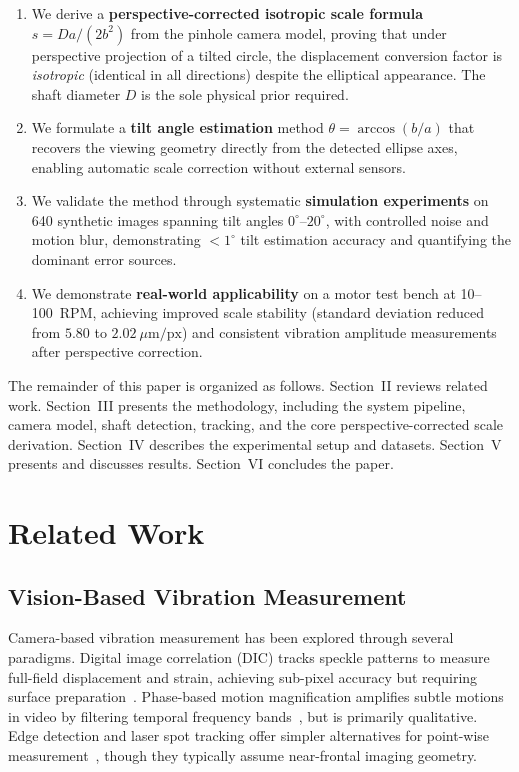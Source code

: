 \documentclass[journal]{IEEEtran}
\begin{document}
\begin{enumerate}
\item We derive a \textbf{perspective-corrected isotropic scale formula}
$s = D a / (2b^{2})$ from the pinhole camera model, proving that under perspective
projection of a tilted circle, the displacement conversion factor is
\emph{isotropic} (identical in all directions) despite the elliptical appearance.
The shaft diameter $D$ is the sole physical prior required.
\item We formulate a \textbf{tilt angle estimation} method $\theta =
\arccos(b/a)$ that recovers the viewing geometry directly from the detected
ellipse axes, enabling automatic scale correction without external sensors.
\item We validate the method through systematic \textbf{simulation experiments}
on 640 synthetic images spanning tilt angles $0^{\circ}$--$20^{\circ}$, with
controlled noise and motion blur, demonstrating ${<}1^{\circ}$ tilt
estimation accuracy and quantifying the dominant error sources.
\item We demonstrate \textbf{real-world applicability} on a motor test bench
at 10--100~RPM, achieving improved scale stability (standard deviation reduced
from $5.80$ to $2.02~\mu\text{m/px}$) and consistent vibration amplitude
measurements after perspective correction.
\end{enumerate}

The remainder of this paper is organized as follows. Section~II reviews related
work. Section~III presents the methodology, including the system pipeline, camera
model, shaft detection, tracking, and the core perspective-corrected scale
derivation. Section~IV describes the experimental setup and datasets. Section~V
presents and discusses results. Section~VI concludes the paper.

\section{Related Work}

\subsection{Vision-Based Vibration Measurement}

Camera-based vibration measurement has been explored through several paradigms.
Digital image correlation (DIC) tracks speckle patterns to measure full-field
displacement and strain, achieving sub-pixel accuracy but requiring surface
preparation~\cite{pan2009}. Phase-based motion magnification amplifies subtle
motions in video by filtering temporal frequency bands~\cite{wadhwa2013}, but
is primarily qualitative. Edge detection and laser spot tracking offer simpler
alternatives for point-wise measurement~\cite{ferraris2012}, though they
typically assume near-frontal imaging geometry.
\end{document}
